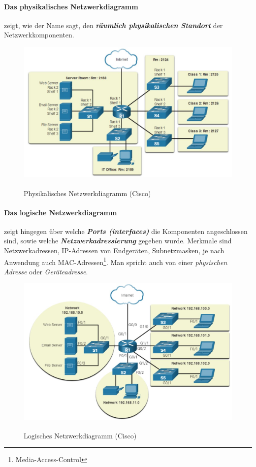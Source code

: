 \paragraph{Das physikalisches Netzwerkdiagramm}zeigt, wie der Name sagt, den \textsl{\textbf{räumlich physikalischen Standort}} der Netzwerkkomponenten.
\begin{figure}[H]
    \begin{center}
    \label{pic:physical_topology}
    \includegraphics[width=\textwidth]{images/physical_topology_diagram.jpg}
    \caption{Physikalisches Netzwerkdiagramm (\textsuperscript{\textcopyright}Cisco)}
    \end{center}
\end{figure}
\paragraph{Das logische Netzwerkdiagramm}zeigt hingegen über welche \textsl{\textbf{Ports (interfaces)}} die Komponenten angeschlossen sind, sowie welche \textsl{\textbf{Netzwerkadressierung}} gegeben wurde. Merkmale sind Netzwerkadressen, IP-Adressen von Endgeräten, Subnetzmasken, je nach Anwendung auch MAC-Adressen\footnote{Media-Access-Control}. Man spricht auch von einer \textsl{physischen Adresse} oder \textsl{Geräteadresse}.
\begin{figure}[H]
    \begin{center}
    \label{pic:logical_topology}
    \includegraphics[width=\textwidth]{images/logical_topology_diagram.jpg}
    \caption{Logisches Netzwerkdiagramm (\textsuperscript{\textcopyright}Cisco)}
    \end{center}
\end{figure}
